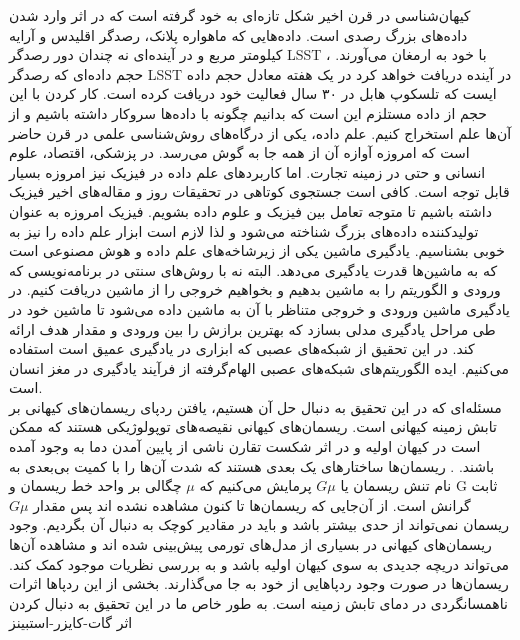 
کیهان‌شناسی در قرن اخیر شکل تازه‌ای به خود گرفته است که در اثر وارد شدن داده‌های بزرگ رصدی است. داده‌هایی که ماهواره پلانک، رصدگر اقلیدس و آرایه کیلومتر مربع
 و در آینده‌ای نه چندان دور رصدگر LSST
 ، با خود به ارمغان می‌آورند. حجم داده‌ای که رصدگر LSST در آینده دریافت خواهد کرد در یک هفته معادل حجم داده ایست که تلسکوپ هابل در ۳۰ سال فعالیت خود دریافت کرده است. کار کردن با این حجم از داده مستلزم این است که بدانیم چگونه با داده‌ها سروکار داشته باشیم و از آن‌ها علم استخراج کنیم. علم داده، یکی از درگاه‌های روش‌شناسی علمی در قرن حاضر است که امروزه آوازه آن از همه جا به گوش می‌رسد. در پزشکی، اقتصاد، علوم انسانی و حتی در زمینه تجارت. اما کاربردهای علم داده در فیزیک نیز امروزه بسیار قابل توجه است. کافی است جستجوی کوتاهی در تحقیقات روز و مقاله‌های اخیر فیزیک داشته باشیم تا متوجه تعامل بین فیزیک و علوم داده بشویم. فیزیک امروزه به عنوان تولیدکننده داده‌های بزرگ شناخته می‌شود و لذا لازم است ابزار علم داده را نیز به خوبی بشناسیم. یادگیری ماشین یکی از زیرشاخه‌های علم داده و هوش مصنوعی است که به ماشین‌ها قدرت یادگیری می‌دهد. البته نه با روش‌های سنتی در برنامه‌نویسی که ورودی و الگوریتم را به ماشین بدهیم و بخواهیم خروجی را از ماشین دریافت کنیم. در یادگیری ماشین ورودی‌ و خروجی متناظر با آن به ماشین داده می‌شود تا ماشین خود در طی مراحل یادگیری مدلی بسازد که بهترین برازش را بین ورودی و مقدار هدف ارائه کند. در این تحقیق از شبکه‌های عصبی 
که ابزاری در یادگیری عمیق است استفاده می‌کنیم. ایده الگوریتم‌های شبکه‌های عصبی الهام‌گرفته از فرآیند یادگیری در مغز انسان است. \\
مسئله‌ای که در این تحقیق به دنبال حل آن هستیم، یافتن ردپای ریسمان‌های کیهانی بر تابش زمینه کیهانی است. ریسمان‌های کیهانی نقیصه‌های توپولوژیکی هستند که ممکن است در کیهان اولیه و در اثر شکست تقارن ناشی از پایین آمدن دما به وجود آمده باشند. 
\cite{kibble1976topology , kibble1980some , hindmarsh1995cosmic}.
ریسمان‌ها ساختارهای یک بعدی هستند که شدت آن‌ها را با کمیت بی‌بعدی به نام تنش
 ریسمان یا $G\mu$ پرمایش می‌کنیم که $\mu$ چگالی بر واحد خط ریسمان و G ثابت گرانش است. از آن‌جایی که ریسمان‌ها تا کنون مشاهده نشده اند پس مقدار $G\mu$ ریسمان نمی‌تواند از حدی بیشتر باشد و باید در مقادیر کوچک به دنبال آن بگردیم. وجود ریسمان‌های کیهانی در بسیاری از مدل‌های تورمی پیش‌بینی شده اند و مشاهده آن‌ها می‌تواند دریچه جدیدی به سوی کیهان اولیه باشد و به بررسی نظریات موجود کمک کند. ریسمان‌ها در صورت وجود ردپاهایی از خود به جا می‌گذارند. بخشی از این ردپاها اثرات ناهمسانگردی در دمای تابش زمینه است. به طور خاص ما در این تحقیق به دنبال کردن اثر گات-کایزر-استبینز
